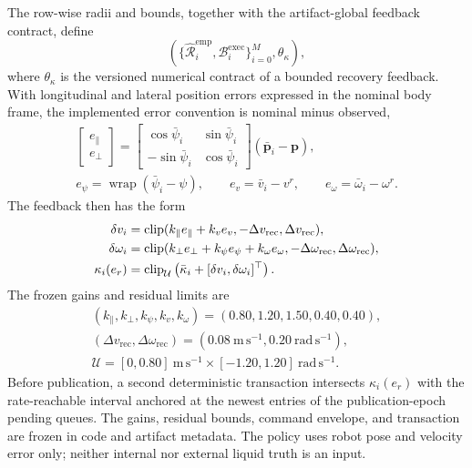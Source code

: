 The row-wise radii and bounds, together with the artifact-global feedback
contract, define
\begin{equation}
  \left(
  \{\widehat{\mathcal R}^{\mathrm{emp}}_i,
  \mathcal B_i^{\mathrm{exec}}\}_{i=0}^{M},\theta_\kappa
  \right),
  \label{eq:phase_objects}
\end{equation}
where $\theta_\kappa$ is the versioned numerical contract of a bounded
recovery feedback.  With longitudinal and lateral position errors expressed
in the nominal body frame, the implemented error convention is nominal minus
observed,
\begin{equation}
\begin{gathered}
\begin{bmatrix}e_\parallel\\e_\perp\end{bmatrix}
=
\begin{bmatrix}
\cos\bar\psi_i&\sin\bar\psi_i\\
-\sin\bar\psi_i&\cos\bar\psi_i
\end{bmatrix}
(\bar{\bm p}_i-\bm p),\\
e_\psi=\operatorname{wrap}(\bar\psi_i-\psi),\qquad
e_v=\bar v_i-v^r,\qquad
e_\omega=\bar\omega_i-\omega^r.
\end{gathered}
\label{eq:recovery_error_convention}
\end{equation}
The feedback then has the form
\begin{align}
  \delta v_i&=\operatorname{clip}
  (k_\parallel e_\parallel+k_v e_v,
   -\Delta v_{\mathrm{rec}},\Delta v_{\mathrm{rec}}),
  \notag\\
  \delta\omega_i&=\operatorname{clip}
  (k_\perp e_\perp+k_\psi e_\psi+k_\omega e_\omega,
   -\Delta\omega_{\mathrm{rec}},\Delta\omega_{\mathrm{rec}}),
  \notag\\
  \kappa_i(e_r)&=\operatorname{clip}_{\mathcal U}
  \left(\bar\kappa_i+
  [\delta v_i,\delta\omega_i]^\top\right).
  \label{eq:recovery_feedback}
\end{align}
The frozen gains and residual limits are
\begin{equation}
\begin{gathered}
(k_\parallel,k_\perp,k_\psi,k_v,k_\omega)
=(0.80,1.20,1.50,0.40,0.40),\\
(\Delta v_{\mathrm{rec}},\Delta\omega_{\mathrm{rec}})
=(0.08~\mathrm{m\,s^{-1}},0.20~\mathrm{rad\,s^{-1}}),\\
\mathcal U=[0,0.80]~\mathrm{m\,s^{-1}}
\times[-1.20,1.20]~\mathrm{rad\,s^{-1}}.
\end{gathered}
\label{eq:recovery_feedback_parameters}
\end{equation}
Before publication, a second deterministic transaction intersects
$\kappa_i(e_r)$ with the rate-reachable interval anchored at the newest
entries of the publication-epoch pending queues.  The gains, residual bounds,
command envelope, and
transaction are frozen in code and artifact metadata.  The policy uses robot
pose and velocity error only; neither internal nor external liquid truth is
an input.

